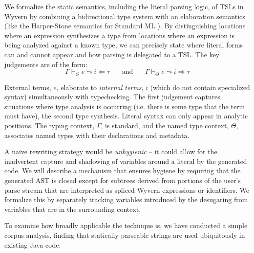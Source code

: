 \begin{contribution}\label{cont:TSL-semantics}
We formalize the static semantics, including the literal parsing logic, of TSLs in Wyvern by combining a bidirectional type system \cite{Pierce:2000:LTI:345099.345100}  with an elaboration semantics (like the Harper-Stone semantics for Standard ML \cite{Harper00atype-theoretic}). By distinguishing locations where an expression synthesizes a type from locations where an expression is being analyzed against a known type, we can precisely state where literal forms can and cannot appear and how parsing is delegated to a TSL. The key judgements are of the form:
\[\Gamma \vdash_\Theta e \leadsto i \Leftarrow \tau~~~~~~~~\text{and}~~~~~~~~\Gamma \vdash_\Theta e  \leadsto i \Rightarrow \tau\]

External terms, $e$, elaborate to \emph{internal terms}, $i$ (which do not contain specialized syntax) simultaneously with typechecking. The first judgement captures situations where type analysis is occurring (i.e. there is some type that the term must have), the second type synthesis. Literal syntax can only appear in analytic positions. The typing context, $\Gamma$, is standard, and the named type context, $\Theta$, associates named types with their declarations and metadata. 
\end{contribution}

\begin{contribution}\label{cont:TSL-hygiene}
 A na\"ive rewriting strategy would be \emph{unhygienic} -- it could allow for the inadvertent capture and shadowing of variables around a literal by the generated code. We will describe a mechanism that ensures hygiene by requiring that the generated AST is closed except for subtrees derived from portions of the user's parse stream that are interpreted as spliced Wyvern expressions or identifiers. We formalize this by  separately tracking variables introduced by the desugaring from variables that are in the surrounding context. %
\end{contribution}


\begin{contribution}\label{cont:TSL-study}
To examine how broadly applicable the technique is, we have conducted a simple corpus analysis, finding that statically parseable strings are used ubiquitously in existing Java code.
\end{contribution}

